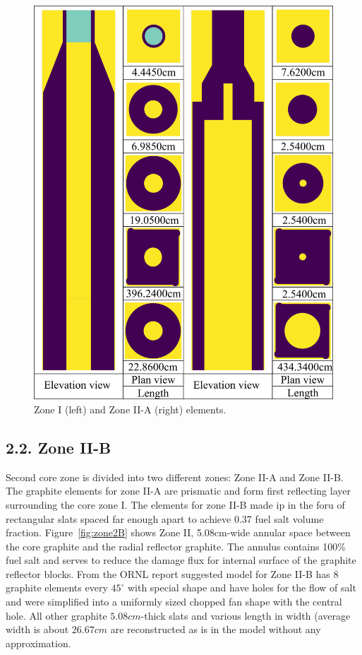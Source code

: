 \documentclass{anstrans}
\begin{document}
\begin{figure}[h] %
  \centering
  \includegraphics[width=0.95\linewidth]{figure_2_4.png}
  \caption{Zone I (left) and Zone II-A (right) elements.}
  \label{fig:zone12A}
\end{figure}

\subsection{2.2. Zone II-B}
Second core zone is divided into two different zones: Zone II-A and Zone II-B. The graphite elements for zone II-A are prismatic and form first reflecting layer surrounding the core zone I. The elements for zone II-B made ip in the foru of rectangular slats spaced far enough apart to achieve 0.37 fuel salt volume fraction. Figure~\ref{fig:zone2B} shows Zone II, 5.08cm-wide annular space between the core graphite and the radial reflector graphite. The annulus contains 100\% fuel salt and serves to reduce the damage flux for internal surface of the graphite reflector blocks. From the ORNL report suggested model for Zone II-B has 8 graphite elements every $45^\circ$ with special shape and have holes for the flow of salt and were simplified into a uniformly sized chopped fan shape with the central hole. All other graphite $5.08cm$-thick slats and various length in width (average width is about $26.67cm$ are reconstructed as is in the model without any approximation.
\end{document}
